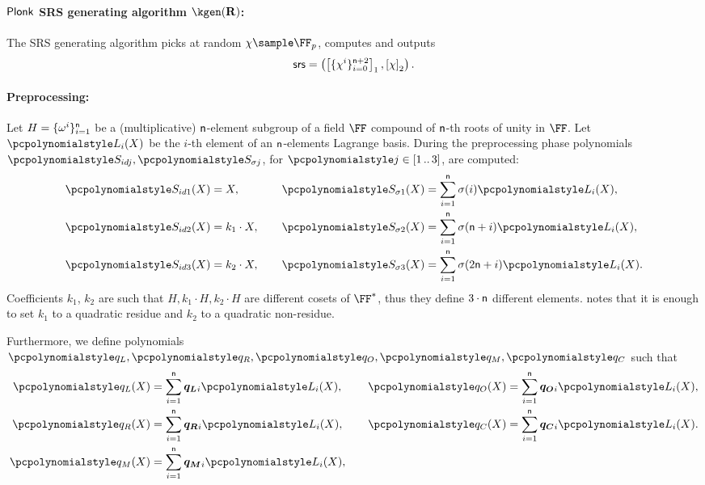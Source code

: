 \documentclass[runningheads,11pt]{llncs}
\begin{document}
\paragraph{$\textnormal{\textsf{Plonk}}$ SRS generating algorithm $\kgen(\REL)$:}
The SRS generating algorithm picks at random $\chi \sample \FF_p$, computes
and outputs
\[
	\mathsf{srs} = \left(\left[\{\chi^i\}_{i = 0}^{\mathsf{n} + 2}\right]_{1},
	\left[\chi\right]_{2} \right).
\]

\paragraph{Preprocessing:}
Let $H = \{\omega^i\}_{i = 1}^{\mathsf{n} }$ be a
(multiplicative) $\mathsf{n}$-element subgroup of a field $\FF$
compound of $\mathsf{n}$-th roots of unity in $\FF$. Let $\lag_i(X)$ be
the $i$-th element of an $\mathsf{n}$-elements Lagrange basis. During
the preprocessing phase polynomials $\p{S_{id j}}, \p{S_{\sigma j}}$, for
$\p{j} \in \range{1}{3}$, are computed:
\begin{equation*}
  \begin{aligned}
    \p{S_{id 1}}(X) & = X,\vphantom{\sum_{i = 1}^{\noofc} \sigma(i) \lag_i(X),}\\
    \p{S_{id 2}}(X) & = k_1 \cdot X,\vphantom{\sum_{i = 1}^{\noofc} \sigma(i) \lag_i(X),}\\
    \p{S_{id 3}}(X) & = k_2 \cdot X,\vphantom{\sum_{i = 1}^{\noofc} \sigma(i) \lag_i(X),}
  \end{aligned}
  \qquad
\begin{aligned}
  \p{S_{\sigma 1}}(X) & = \sum_{i = 1}^{\noofc} \sigma(i) \lag_i(X),\\
  \p{S_{\sigma 2}}(X) & = \sum_{i = 1}^{\noofc}
  \sigma(\noofc + i) \lag_i(X),\\
  \p{S_{\sigma 3}}(X) & =\sum_{i = 1}^{\noofc} \sigma(2 \noofc + i) \lag_i(X).
\end{aligned}
\end{equation*}
Coefficients $k_1$, $k_2$ are such that $H, k_1 \cdot H, k_2 \cdot H$ are
different cosets of $\FF^*$, thus they define $3 \cdot \mathsf{n}$
different elements. \cite{EPRINT:GabWilCio19} notes that it is enough to set
$k_1$ to a quadratic residue and $k_2$ to a quadratic non-residue.

Furthermore, we define polynomials $\p{q_L}, \p{q_R}, \p{q_O}, \p{q_M}, \p{q_C}$
such that
\begin{equation*}
  \begin{aligned}
  \p{q_L}(X) & = \sum_{i = 1}^{\noofc} \vql_i \lag_i(X), \\
  \p{q_R}(X) & = \sum_{i = 1}^{\noofc} \vqr_i \lag_i(X), \\
  \p{q_M}(X) & = \sum_{i = 1}^{\noofc} \vqm_i \lag_i(X),
\end{aligned}
\qquad
\begin{aligned}
  \p{q_O}(X) & = \sum_{i = 1}^{\noofc} \vqo_i \lag_i(X), \\
  \p{q_C}(X) & = \sum_{i = 1}^{\noofc} \vqc_i \lag_i(X). \\
  \vphantom{\p{q_M}(X)  = \sum_{i = 1}^{\noofc} \vqm_i \lag_i(X),}
\end{aligned}
\end{equation*}
\end{document}
